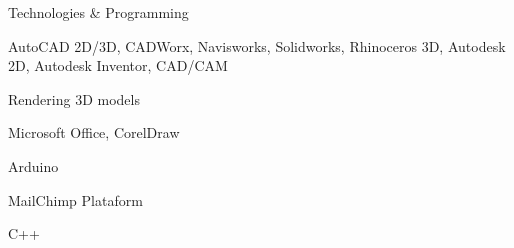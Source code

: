 \begin{cventries}
  \cventry
    {Technologies \& Programming} %
    {} 
    {} 
    {} 
    {
      \begin{cvitems} %
        \item[]{AutoCAD 2D/3D, CADWorx, Navisworks, Solidworks, Rhinoceros 3D, Autodesk 2D, Autodesk Inventor, CAD/CAM}
        \item[]{Rendering 3D models}
  		\item[]{Microsoft Office, CorelDraw}
		\item[]{Arduino}
		\item[]{MailChimp Plataform}
		\item[]{C++}
      \end{cvitems}
    }  
  \vspace{0.2cm} 


\end{cventries}